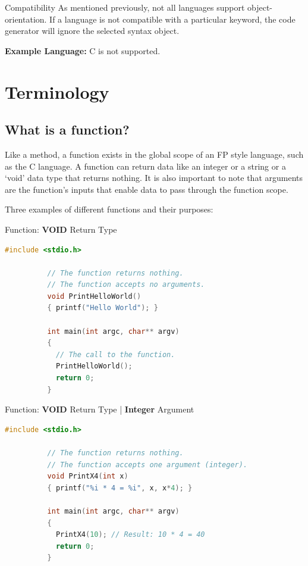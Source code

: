 \documentclass[10pt]{article}
\begin{document}
        \begin{tip}{Compatibility}
            As mentioned previously, not all languages support object-orientation. If a language is not compatible with a particular keyword, the code generator will ignore the selected syntax object.

            \textbf{Example Language:} C is not supported.
        \end{tip}

\newpage
\section{Terminology}
\label{sec:terminology}
    \subsection{What is a function?}
      Like a method, a function exists in the global scope of an FP style language, such as the C language. A function can return data like an integer or a string or a `void' data type that returns nothing. It is also important to note that arguments are the function's inputs that enable data to pass through the function scope.

      Three examples of different functions and their purposes:
      \begin{example}{Function: \textbf{VOID} Return Type}
        \begin{lstlisting}[language=c]
          #include <stdio.h>

          // The function returns nothing.
          // The function accepts no arguments.
          void PrintHelloWorld()
          { printf("Hello World"); }

          int main(int argc, char** argv)
          {
            // The call to the function.
            PrintHelloWorld();
            return 0;
          }
        \end{lstlisting}
      \end{example}

      \begin{example}{Function: \textbf{VOID} Return Type | \textbf{Integer} Argument}
        \begin{lstlisting}[language=c]
          #include <stdio.h>

          // The function returns nothing.
          // The function accepts one argument (integer).
          void PrintX4(int x)
          { printf("%i * 4 = %i", x, x*4); }

          int main(int argc, char** argv)
          {
            PrintX4(10); // Result: 10 * 4 = 40
            return 0;
          }
        \end{lstlisting}
      \end{example}
\end{document}
